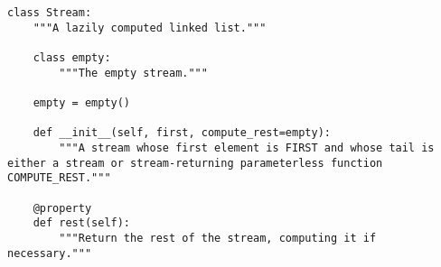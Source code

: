 \begin{lstlisting}
class Stream:
    """A lazily computed linked list."""

    class empty:
        """The empty stream."""

    empty = empty()

    def __init__(self, first, compute_rest=empty):
        """A stream whose first element is FIRST and whose tail is either a stream or stream-returning parameterless function COMPUTE_REST."""

    @property
    def rest(self):
        """Return the rest of the stream, computing it if necessary."""
\end{lstlisting}
